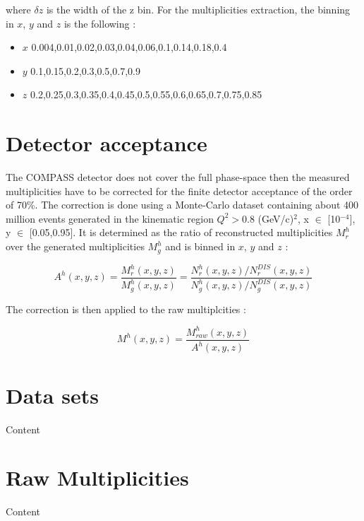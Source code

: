 where $\delta z$ is the width of the z bin. For the multiplicities extraction, the binning in
$x$, $y$ and $z$ is the following :

\begin{itemize}
  \item $x$ {0.004,0.01,0.02,0.03,0.04,0.06,0.1,0.14,0.18,0.4}
  \item $y$ {0.1,0.15,0.2,0.3,0.5,0.7,0.9}
  \item $z$ {0.2,0.25,0.3,0.35,0.4,0.45,0.5,0.55,0.6,0.65,0.7,0.75,0.85}
\end{itemize}


\section{Detector acceptance}

The COMPASS detector does not cover the full phase-space then the measured multiplicities have
to be corrected for the finite detector acceptance of the order of 70\%. The correction is
done using a Monte-Carlo dataset containing about 400 million events generated in the kinematic
region $Q^2 > 0.8$ (GeV/c)$^2$, x $\in$ [10$^{-4}$], y $\in$ [0.05,0.95]. It is determined as the ratio
of reconstructed multiplicities $M^h_r$ over the generated multiplicities $M^h_g$ and is binned in $x$, $y$
and $z$ :

\begin{equation}
  A^h(x,y,z) = \frac{M^h_r(x,y,z)}{M^h_g(x,y,z)}=\frac{N^h_r(x,y,z)/N^{DIS}_r(x,y,z)}{N^h_g(x,y,z)/N^{DIS}_g(x,y,z)}
\end{equation}

The correction is then applied to the raw multiplcities :

\begin{equation}
  M^h(x,y,z) = \frac{M^h_{raw}(x,y,z)}{A^h(x,y,z)}
\end{equation}


\section{Data sets}

Content


\section{Raw Multiplicities}

Content
